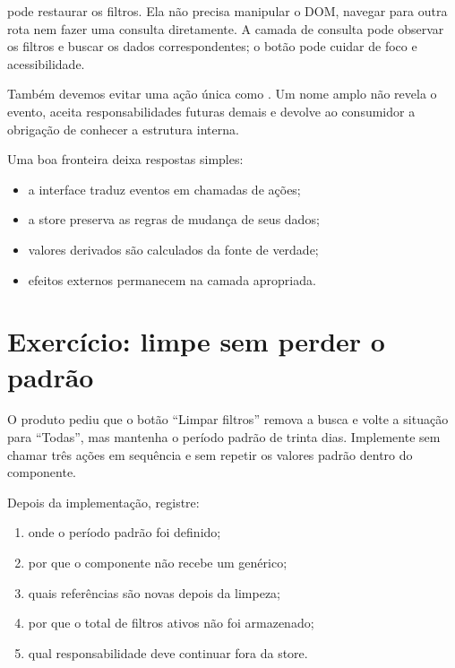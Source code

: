  pode restaurar os filtros. Ela não precisa manipular o
DOM, navegar para outra rota nem fazer uma consulta diretamente. A camada de
consulta pode observar os filtros e buscar os dados correspondentes; o botão
pode cuidar de foco e acessibilidade.

Também devemos evitar uma ação única como . Um nome
amplo não revela o evento, aceita responsabilidades futuras demais e devolve ao
consumidor a obrigação de conhecer a estrutura interna.

Uma boa fronteira deixa respostas simples:

\begin{itemize}
  \item a interface traduz eventos em chamadas de ações;
  \item a store preserva as regras de mudança de seus dados;
  \item valores derivados são calculados da fonte de verdade;
  \item efeitos externos permanecem na camada apropriada.
\end{itemize}

\section{Exercício: limpe sem perder o padrão}

\begin{tarefa}
O produto pediu que o botão ``Limpar filtros'' remova a busca e volte a situação
para ``Todas'', mas mantenha o período padrão de trinta dias. Implemente
 sem chamar três ações em sequência e sem repetir os valores
padrão dentro do componente.
\end{tarefa}

Depois da implementação, registre:

\begin{enumerate}
  \item onde o período padrão foi definido;
  \item por que o componente não recebe um  genérico;
  \item quais referências são novas depois da limpeza;
  \item por que o total de filtros ativos não foi armazenado;
  \item qual responsabilidade deve continuar fora da store.
\end{enumerate}


